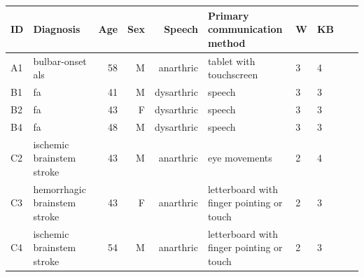\footnotesize
\begin{tabular}{@{}llrrrlllrr@{}}
	\toprule
	\textbf{ID}     & \textbf{Diagnosis}                    & \textbf{Age} & \textbf{Sex} &
	\textbf{Speech} & \textbf{Primary communication method} &
	\textbf{W}      & \textbf{KB}                                                                                                                          \\ \midrule
	A1              & bulbar-onset \acs{als}                & 58           & M            & anarthric  & tablet with touchscreen                   & 3 & 4 \\
	B1              & \acs{fa}                              & 41           & M            & dysarthric & speech                                    & 3 & 3 \\
	B2              & \acs{fa}                              & 43           & F            & dysarthric & speech                                    & 3 & 3 \\
	B4              & \acs{fa}                              & 48           & M            & dysarthric & speech                                    & 3 & 3 \\
	C2              & ischemic brainstem stroke             & 43           & M            & anarthric  & eye movements                             & 2 & 4 \\
	C3              & hemorrhagic brainstem stroke          & 43           & F            & anarthric  & letterboard with finger pointing or touch & 2 & 3 \\
	C4              & ischemic brainstem stroke             & 54           & M            & anarthric  & letterboard with finger pointing or touch & 2 & 3 \\
	\bottomrule
\end{tabular}
